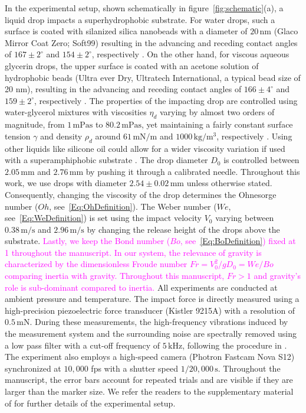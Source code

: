 \documentclass{jfm}
\newcommand{\Rev}[1]{\todo[color=orange, bordercolor=none, textcolor=white]{R2}\textcolor{magenta}{#1}}
\begin{document}
In the experimental setup, shown schematically in figure~\ref{fig:schematic}(a), a liquid drop impacts a superhydrophobic substrate. For water drops, such a surface is coated with silanized silica nanobeads with a diameter of $20\,\si{\nano\meter}$ (Glaco Mirror Coat Zero; Soft99) resulting in the advancing and receding contact angles of $167 \pm 2^{\circ}$ and $154 \pm 2^{\circ}$, respectively \citep{Gauthier2015, Li2017}. On the other hand, for viscous aqueous glycerin drops, the upper surface is coated with an acetone solution of hydrophobic beads (Ultra ever Dry, Ultratech International, a typical bead size of 20 nm), resulting in the advancing and receding contact angles of $166 \pm 4^{\circ}$ and $159 \pm 2^{\circ}$, respectively \citep{Jha2020}. 
The properties of the impacting drop are controlled using water-glycerol mixtures with viscosities $\eta_d$ varying by almost two orders of magnitude, from $1\,\si{\milli\pascal}\si{\second}$ to $80.2\,\si{\milli\pascal}\si{\second}$, yet maintaining a fairly constant surface tension $\gamma$ and density $\rho_d$ around $61\,\si{\milli\newton}/\si{\meter}$ and $1000\,\si{\kilo\gram}/\si{\cubic\meter}$, respectively \citep{cheng2008formula, volk2018density, Jha2020}. Using other liquids like silicone oil could allow for a wider viscosity variation if used with a superamphiphobic substrate \citep{deng2012candle}. The drop diameter $D_0$ is controlled between $2.05\,\si{\milli\meter}$ and $2.76\,\si{\milli\meter}$ by pushing it through a calibrated needle. Throughout this work, we use drops with diameter $2.54 \pm 0.02\,\si{\milli\meter}$ unless otherwise stated. Consequently, changing the viscosity of the drop determines the Ohnesorge number ($Oh$, see~\eqref{Eq:OhDefinition}). The Weber number ($We$, see~\eqref{Eq:WeDefinition}) is set using the impact velocity $V_0$ varying between $0.38\,\si{\meter}/\si{\second}$ and $2.96\,\si{\meter}/\si{\second}$ by changing the release height of the drops above the substrate. \Rev{Lastly, we keep the Bond number ($Bo$, see~\eqref{Eq:BoDefinition}) fixed at 1 throughout the manuscript. In our system, the relevance of gravity is characterized by the dimensionless Froude number $Fr = V_0^2/gD_0 = We/Bo$ comparing inertia with gravity. Throughout this manuscript, $Fr > 1$ and gravity's role is sub-dominant compared to inertia.}
All experiments are conducted at ambient pressure and temperature. The impact force is directly measured using a high-precision piezoelectric force transducer (Kistler 9215A) with a resolution of $0.5\,\si{\milli\newton}$. During these measurements, the high-frequency vibrations induced by the measurement system and the surrounding noise are spectrally removed using a low pass filter with a cut-off frequency of $5\,\si{\kilo\hertz}$, following the procedure in \citet{Li2014, Zhang2017, Gordillo2018, Mitchell2019}. 
The experiment also employs a high-speed camera (Photron Fastcam Nova S12) synchronized at $10,000$ fps with a shutter speed $1/20,000\,\si{\second}$. Throughout the manuscript, the error bars account for repeated trials and are visible if they are larger than the marker size. We refer the readers to the supplementary material of \citet{zhang2022impact} for further details of the experimental setup.
\end{document}

